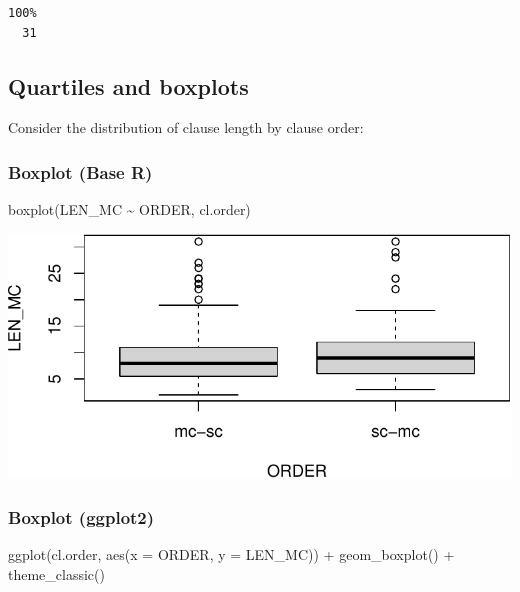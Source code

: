\documentclass[
  11pt,
  letterpaper,
  DIV=11,
  numbers=noendperiod]{scrreprt}
\newenvironment{Shaded}{\begin{snugshade}}{\end{snugshade}}
\newcommand{\AttributeTok}[1]{\textcolor[rgb]{0.40,0.45,0.13}{#1}}
\newcommand{\DecValTok}[1]{\textcolor[rgb]{0.68,0.00,0.00}{#1}}
\newcommand{\FunctionTok}[1]{\textcolor[rgb]{0.28,0.35,0.67}{#1}}
\newcommand{\NormalTok}[1]{\textcolor[rgb]{0.00,0.23,0.31}{#1}}
\newcommand{\SpecialCharTok}[1]{\textcolor[rgb]{0.37,0.37,0.37}{#1}}
\begin{document}
\begin{Shaded}
\end{Shaded}

\begin{verbatim}
100% 
  31 
\end{verbatim}

\subsection{Quartiles and boxplots}\label{quartiles-and-boxplots}

Consider the distribution of clause length by clause order:

\subsubsection{Boxplot (Base R)}

\begin{Shaded}
\begin{Highlighting}[]
\FunctionTok{boxplot}\NormalTok{(LEN\_MC }\SpecialCharTok{\textasciitilde{}}\NormalTok{ ORDER, cl.order)}
\end{Highlighting}
\end{Shaded}

\includegraphics{Summary_statistics_files/figure-pdf/unnamed-chunk-22-1.pdf}

\subsubsection{Boxplot (ggplot2)}

\begin{Shaded}
\begin{Highlighting}[]
\FunctionTok{ggplot}\NormalTok{(cl.order, }\FunctionTok{aes}\NormalTok{(}\AttributeTok{x =}\NormalTok{ ORDER, }\AttributeTok{y =}\NormalTok{ LEN\_MC)) }\SpecialCharTok{+}
  \FunctionTok{geom\_boxplot}\NormalTok{() }\SpecialCharTok{+}
  \FunctionTok{theme\_classic}\NormalTok{()}
\end{Highlighting}
\end{Shaded}
\end{document}
